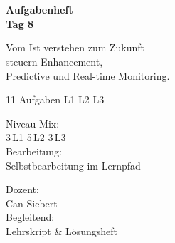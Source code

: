 \documentclass[11pt,a4paper,oneside]{article}
\begin{document}
\begin{titlepage}
  \pagestyle{empty}
  \vspace*{1.5cm}
  \\[2pt]
  \noindent{\color{lpAccent}\rule{\linewidth}{1.2pt}}\\[4pt]

  \vspace{3cm}
  {\sffamily\fontsize{30}{34}\selectfont\bfseries\color{lpInk}Aufgabenheft\\Tag 8\par}

  \vspace{0.7cm}
  {\sffamily\large\color{lpGray}Vom Ist verstehen zum Zukunft\\steuern \textendash{} Enhancement,\\Predictive und Real-time Monitoring.\par}

  \vspace{1.5cm}
  {\caveatfont\LARGE\color{lpAmber}11 Aufgaben \textperiodcentered{} L1 \textperiodcentered{} L2 \textperiodcentered{} L3}\par

  \vfill

  \noindent\begin{minipage}{0.55\linewidth}
    {\sffamily\footnotesize\color{lpGray}Niveau-Mix:}\\
    {\sffamily\small\color{lpInk}3\,\textsf{L1} \textperiodcentered{} 5\,\textsf{L2} \textperiodcentered{} 3\,\textsf{L3}}\\[10pt]
    {\sffamily\footnotesize\color{lpGray}Bearbeitung:}\\
    {\sffamily\small\color{lpInk}Selbstbearbeitung im Lernpfad}
  \end{minipage}\hfill
  \begin{minipage}{0.4\linewidth}
    \raggedleft
    {\sffamily\footnotesize\color{lpGray}Dozent:}\\
    {\sffamily\small\color{lpInk}Can Siebert}\\[10pt]
    {\sffamily\footnotesize\color{lpGray}Begleitend:}\\
    {\sffamily\small\color{lpInk}Lehrskript \& L\"osungsheft}
  \end{minipage}

  \vspace{0.5cm}
  \noindent{\color{lpAccent}\rule{\linewidth}{0.6pt}}
\end{titlepage}
\end{document}
